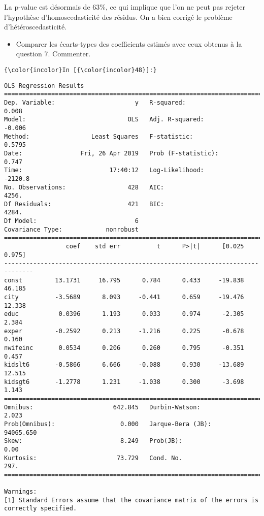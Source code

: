 \documentclass[11pt]{article}
\providecommand{\tightlist}{%
      \setlength{\itemsep}{0pt}\setlength{\parskip}{0pt}}
\begin{document}
    La p-value est désormais de 63\%, ce qui implique que l'on ne peut pas
rejeter l'hypothèse d'homoscedasticité des résidus. On a bien corrigé le
problème d'hétéroscedasticité.

    \begin{itemize}
\tightlist
\item
  Comparer les écarts-types des coefficients estimés avec ceux obtenus à
  la question 7. Commenter.
\end{itemize}

    \begin{Verbatim}[commandchars=\\\{\}]
{\color{incolor}In [{\color{incolor}48}]:} 
\end{Verbatim}


    \begin{Verbatim}[commandchars=\\\{\}]
                            OLS Regression Results                            
==============================================================================
Dep. Variable:                      y   R-squared:                       0.008
Model:                            OLS   Adj. R-squared:                 -0.006
Method:                 Least Squares   F-statistic:                    0.5795
Date:                Fri, 26 Apr 2019   Prob (F-statistic):              0.747
Time:                        17:40:12   Log-Likelihood:                -2120.8
No. Observations:                 428   AIC:                             4256.
Df Residuals:                     421   BIC:                             4284.
Df Model:                           6                                         
Covariance Type:            nonrobust                                         
==============================================================================
                 coef    std err          t      P>|t|      [0.025      0.975]
------------------------------------------------------------------------------
const         13.1731     16.795      0.784      0.433     -19.838      46.185
city          -3.5689      8.093     -0.441      0.659     -19.476      12.338
educ           0.0396      1.193      0.033      0.974      -2.305       2.384
exper         -0.2592      0.213     -1.216      0.225      -0.678       0.160
nwifeinc       0.0534      0.206      0.260      0.795      -0.351       0.457
kidslt6       -0.5866      6.666     -0.088      0.930     -13.689      12.515
kidsgt6       -1.2778      1.231     -1.038      0.300      -3.698       1.143
==============================================================================
Omnibus:                      642.845   Durbin-Watson:                   2.023
Prob(Omnibus):                  0.000   Jarque-Bera (JB):            94065.650
Skew:                           8.249   Prob(JB):                         0.00
Kurtosis:                      73.729   Cond. No.                         297.
==============================================================================

Warnings:
[1] Standard Errors assume that the covariance matrix of the errors is correctly specified.

    \end{Verbatim}
\end{document}
